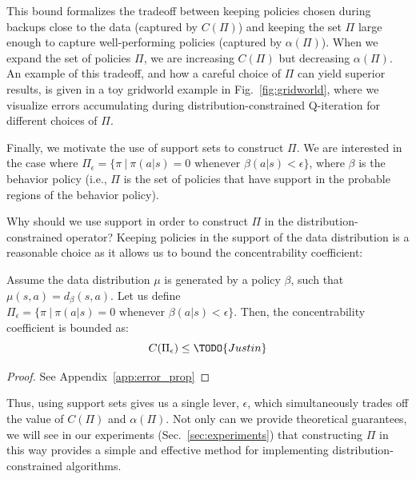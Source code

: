 This bound formalizes the tradeoff between keeping policies chosen during backups close to the data (captured by $C(\Pi)$) and keeping the set $\Pi$ large enough to capture well-performing policies (captured by $\alpha(\Pi)$). When we expand the set of policies $\Pi$, we are increasing $C(\Pi)$ but decreasing $\alpha(\Pi)$. An example of this tradeoff, and how a careful choice of $\Pi$ can yield superior results, is given in a toy gridworld example in Fig.~\ref{fig:gridworld}, where we visualize errors accumulating during distribution-constrained Q-iteration for different choices of $\Pi$. 

Finally, we motivate the use of support sets to construct $\Pi$. We are interested in the case where $\Pi_\epsilon = \{ \pi ~|~ \pi( a | s) = 0 \text{ whenever } \beta( a | s) < \epsilon \}$, where $\beta$ is the behavior policy (i.e., $\Pi$ is the set of policies that have support in the probable regions of the behavior policy). 

Why should we use support in order to construct $\Pi$ in the distribution-constrained operator? Keeping policies in the support of the data distribution is a reasonable choice as it allows us to bound the concentrability coefficient:
\begin{theorem}
\label{thm:conc_coeff_bound}
Assume the data distribution $\mu$ is generated by a policy $\beta$, such that $\mu(s,a) = d_\beta(s,a)$. Let us define $\Pi_\epsilon = \{ \pi ~|~ \pi( a | s) = 0 \text{ whenever } \beta( a | s) < \epsilon \}$. Then, the concentrability coefficient is bounded as:
\[
C(\Pi_\epsilon) \le \TODO{Justin}
\]
\end{theorem}
\begin{proof} See Appendix~\ref{app:error_prop} \end{proof}

Thus, using support sets gives us a single lever, $\epsilon$, which simultaneously trades off the value of $C(\Pi)$ and $\alpha(\Pi)$. Not only can we provide theoretical guarantees, we will see in our experiments (Sec.~\ref{sec:experiments}) that constructing $\Pi$ in this way provides a simple and effective method for implementing distribution-constrained algorithms.

